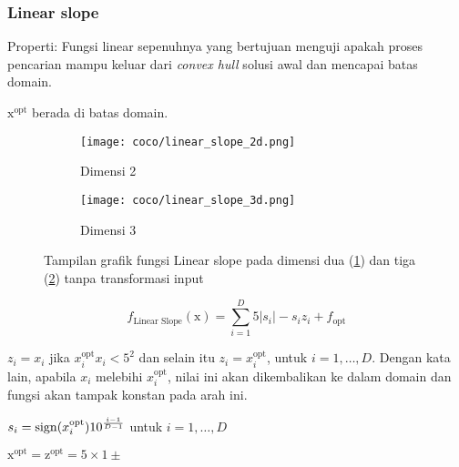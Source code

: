 \subsubsection*{Linear slope}
\noindent Properti:
Fungsi linear sepenuhnya yang bertujuan menguji apakah proses pencarian mampu keluar dari \textit{convex hull} solusi awal dan mencapai batas domain.
\begin{packed_item}
  \item $\mathrm{x}^{\text{opt}}$ berada di batas domain.
\end{packed_item}
\begin{figure}[H]
	\centering
	\begin{subfigure}[b]{0.4\textwidth}
		\centering
		\texttt{[image: coco/linear\_slope\_2d.png]}
		\caption{Dimensi 2}
		\label{fig:linear_slope_2d}
	\end{subfigure}
	\hfill
	\begin{subfigure}[b]{0.4\textwidth}
		\centering
		\texttt{[image: coco/linear\_slope\_3d.png]}
		\caption{Dimensi 3}
		\label{fig:linear_slope_3d}
	\end{subfigure}
	\caption{Tampilan grafik fungsi Linear slope pada dimensi dua (\cref{fig:linear_slope_2d}) dan tiga (\cref{fig:linear_slope_3d}) tanpa transformasi input}
	\label{fig:linear_slope}
\end{figure}
\begin{equation}
  f_{\text{Linear Slope}}(\mathrm{x})=\sum_{i=1}^{D}5|s_i|-s_iz_i+f_{\text{opt}}
\end{equation}
\begin{packed_item}
    \item $z_i=x_i$ jika $x_i^{\text{opt}}x_i < 5^2$ dan selain itu $z_i=x_i^{\text{opt}}$, untuk $i=1,\ldots,D$. Dengan kata lain, apabila $x_i$ melebihi $x_i^{\text{opt}}$, nilai ini akan dikembalikan ke dalam domain dan fungsi akan tampak konstan pada arah ini.
    \item $s_i=\operatorname{sign}(x_i^{\text{opt}})10^{\frac{i-1}{D-1}}$ untuk $i=1,\ldots,D$
    \item $\mathrm{x}^{\text{opt}}=\mathrm{z}^{\text{opt}}=5\times 1 \pm$
\end{packed_item}

